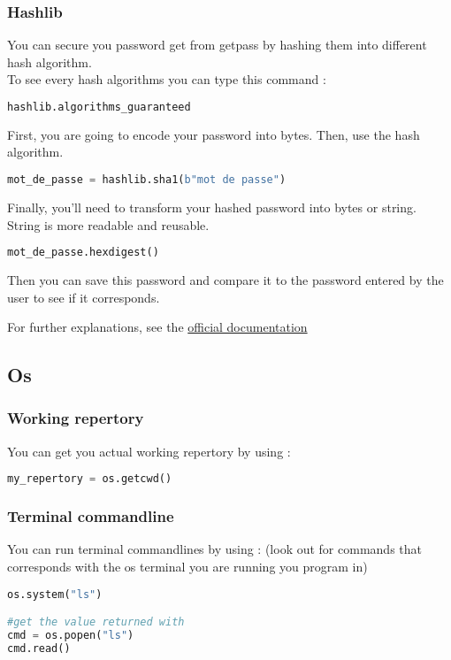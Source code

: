 \documentclass[a4paper, 12pt, titlepage]{scrartcl} %
\begin{document}
\subsubsection{Hashlib}
You can secure you password get from getpass by hashing them into different hash algorithm.\\
To see every hash algorithms you can type this command : 
\begin{lstlisting}[language=Python]
hashlib.algorithms_guaranteed
\end{lstlisting} \vspace{5mm}
First, you are going to encode your password into bytes. Then, use the hash algorithm.
\begin{lstlisting}[language=Python]
mot_de_passe = hashlib.sha1(b"mot de passe")
\end{lstlisting} \vspace{5mm}
Finally, you'll need to transform your hashed password into bytes or string. String is more readable and reusable.
\begin{lstlisting}[language=Python]
mot_de_passe.hexdigest()
\end{lstlisting} \vspace{5mm}
Then you can save this password and compare it to the password entered by the user to see if it corresponds.



For further explanations, see the \href{https://docs.python.org/3/library/hashlib.html}{official documentation}


\subsection{Os}
\subsubsection{Working repertory}
You can get you actual working repertory by using :
\begin{lstlisting}[language=Python]
my_repertory = os.getcwd()
\end{lstlisting} \vspace{5mm}

\subsubsection{Terminal commandline}
You can run terminal commandlines by using : (look out for commands that corresponds with the os terminal you are running you program in)
\begin{lstlisting}[language=Python]
os.system("ls")

#get the value returned with
cmd = os.popen("ls")
cmd.read()
\end{lstlisting} \vspace{5mm}
\end{document}
